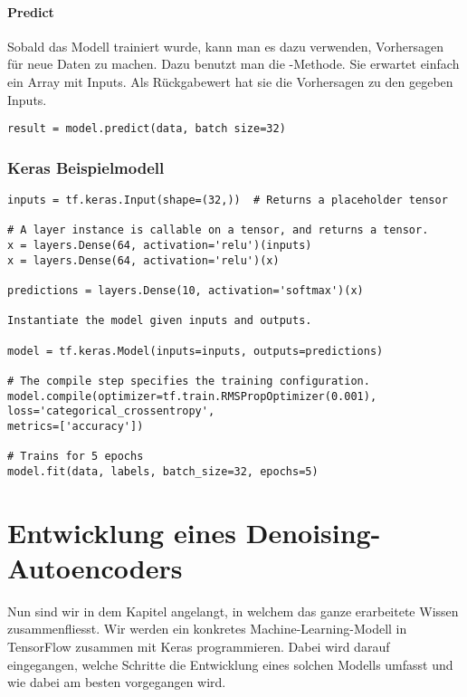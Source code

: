 \subsubsection{Predict}
Sobald das Modell trainiert wurde, kann man es dazu verwenden, Vorhersagen für
neue Daten zu machen. Dazu benutzt man die -Methode. Sie erwartet
einfach ein Array mit Inputs. Als Rückgabewert hat sie die Vorhersagen zu den
gegeben Inputs.

\begin{verbatim}
result = model.predict(data, batch size=32)
\end{verbatim}

\subsection{Keras Beispielmodell}

\begin{verbatim}
inputs = tf.keras.Input(shape=(32,))  # Returns a placeholder tensor

# A layer instance is callable on a tensor, and returns a tensor.
x = layers.Dense(64, activation='relu')(inputs)
x = layers.Dense(64, activation='relu')(x)

predictions = layers.Dense(10, activation='softmax')(x)

Instantiate the model given inputs and outputs.

model = tf.keras.Model(inputs=inputs, outputs=predictions)

# The compile step specifies the training configuration.
model.compile(optimizer=tf.train.RMSPropOptimizer(0.001),
loss='categorical_crossentropy',
metrics=['accuracy'])

# Trains for 5 epochs
model.fit(data, labels, batch_size=32, epochs=5)
\end{verbatim}



\chapter{Entwicklung eines Denoising-Autoencoders}
Nun sind wir in dem Kapitel angelangt, in welchem das ganze erarbeitete Wissen
zusammenfliesst. Wir werden ein konkretes Machine-Learning-Modell in TensorFlow
zusammen mit Keras programmieren. Dabei wird darauf eingegangen, welche Schritte die
Entwicklung eines solchen Modells umfasst und wie dabei am besten vorgegangen
wird.

